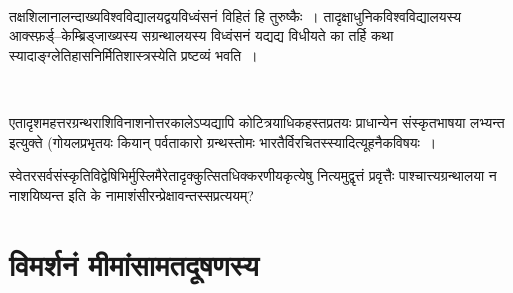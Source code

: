 \begin{myquote}

~\hfill {}
\end{myquote}

तक्षशिलानालन्दाख्यविश्वविद्यालयद्वयविध्वंसनं विहितं हि तुरुष्कैः~। तादृक्षाधुनिकविश्वविद्यालयस्य आक्स्फ़र्ड्–केम्ब्रिड्जाख्यस्य सग्रन्थालयस्य विध्वंसनं यद्यद्य विधीयते का तर्हि कथा स्यादाङ्ग्लेतिहासनिर्मितिशास्त्रस्येति प्रष्टव्यं भवति~।

\begin{myquote}

~\hfill {} 
\end{myquote}

एतादृशमहत्तरग्रन्थराशिविनाशनोत्तरकालेऽप्यद्यापि कोटित्रयाधिकहस्तप्रतयः प्राधान्येन संस्कृतभाषया लभ्यन्त इत्युक्ते (गोयलप्रभृतयः  कियान् पर्वताकारो ग्रन्थस्तोमः भारतैर्विरचितस्स्यादित्यूहनैकविषयः~।

स्वेतरसर्वसंस्कृतिविद्वेषिभिर्मुस्लिमैरेतादृक्कुत्सितधिक्करणीयकृत्येषु नित्यमुद्वृत्तं प्रवृत्तैः पाश्चात्त्यग्रन्थालया न नाशयिष्यन्त इति के नामाशंसीरन्प्रेक्षावन्तस्सप्रत्ययम्?


\section*{विमर्शनं मीमांसामतदूषणस्य}

